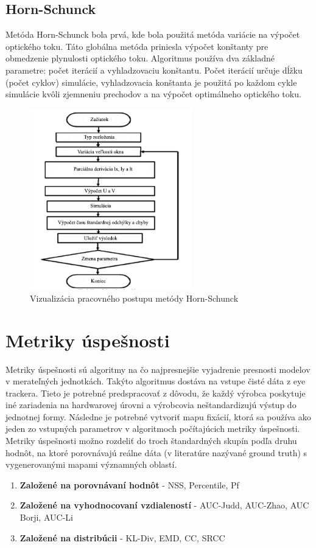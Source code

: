 \subsection{Horn-Schunck}
Metóda Horn-Schunck bola prvá, kde bola použitá metóda variácie na výpočet optického toku.
Táto globálna metóda priniesla výpočet  konštanty pre obmedzenie plynulosti optického toku.
Algoritmus používa dva základné parametre: počet iterácií a vyhladzovaciu konštantu.
Počet iterácií určuje dĺžku (počet cyklov) simulácie, vyhladzovacia konštanta je použitá po každom cykle simulácie kvôli zjemneniu prechodov a na výpočet optimálneho optického toku.

\begin{figure}[H]
  \centering
  \includegraphics[width=7cm]{pics/horn-schunck.png}
  \caption{Vizualizácia pracovného postupu metódy Horn-Schunck}
\end{figure}
\vspace{10mm}

\section{Metriky úspešnosti}
Metriky úspešnosti sú algoritmy na čo najpresnejšie vyjadrenie presnosti modelov v merateľných jednotkách.
Takýto algoritmus dostáva na vstupe čisté dáta z eye trackera.
Tieto je potrebné predspracovať z dôvodu, že každý výrobca poskytuje iné zariadenia na hardwarovej úrovni a výrobcovia neštandardizujú výstup do jednotnej formy.
Následne je potrebné vytvoriť mapu fixácií, ktorá sa používa ako jeden zo vstupných parametrov v algoritmoch počítajúcich metriky úspešnosti.
\\
Metriky úspešnosti možno rozdeliť do troch štandardných skupín podľa druhu hodnôt, na ktoré porovnávajú reálne dáta (v literatúre nazývané ground truth) s vygenerovanými mapami významných oblastí\cite{metrics-1}.
\begin{enumerate}
  \item\textbf{Založené na porovnávaní hodnôt} - NSS, Percentile, Pf
  \item\textbf{Založené na vyhodnocovaní vzdialeností} - AUC-Judd, AUC-Zhao, AUC Borji, AUC-Li
  \item\textbf{Založené na distribúcii} - KL-Div, EMD, CC, SRCC
\end{enumerate}

